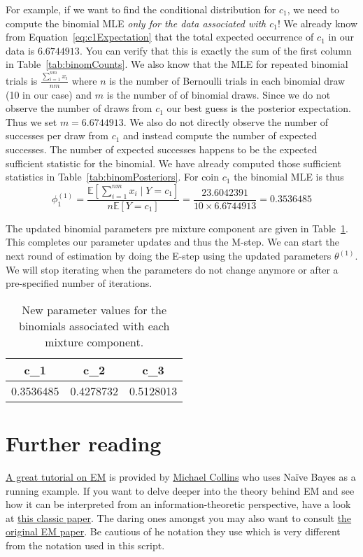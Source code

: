 \documentclass[11pt,leqno,a4paper]{report}\usepackage[]{graphicx}\usepackage[]{color}
\newcommand{\E}{\mathbb{E}}
\begin{document}
For example, if we want to find the conditional distribution for $ c_{1} $, we need to compute the binomial MLE \textit{only
for the data associated with $ c_{1} $}! We already know from Equation~\eqref{eq:c1Expectation} that the total expected 
occurrence of $ c_{1} $ in our data is $ 6.6744913 $. You can verify that this is exactly the sum of the first column in
Table~\ref{tab:binomCounts}. We also know that the MLE for repeated binomial trials is $ \frac{\sum^{nm}_{i=1}x_{i}}{nm} $ where
$ n $ is the number of Bernoulli trials in each binomial draw (10 in our case) and $ m $ is the number of of binomial draws. Since we do
not observe the number of draws from $ c_{1} $ our best guess is the posterior expectation. Thus we set $ m = 6.6744913 $. We also do not
directly observe the number of successes per draw from $ c_{1} $ and instead compute the number of expected successes. The number of 
expected successes happens to be the expected sufficient statistic for the binomial. We have already computed those sufficient statistics
in Table~\ref{tab:binomPosteriors}. For coin $ c_{1} $ the binomial MLE is thus
\begin{equation}
\phi_{1}^{(1)} =  \frac{\E\left[\sum_{i=1}^{nm} x_{i}\mid Y = c_{1}\right]}{n\E\left[Y = c_{1}\right]} 
= \frac{23.6042391}{10 \times 6.6744913}
= 0.3536485
\end{equation}

The updated binomial parameters pre mixture component are given in Table~\ref{tab:newBinoms}. This completes our parameter
updates and thus the M-step. We can start the next round of estimation by doing the E-step using the
updated parameters $ \theta^{(1)} $. We will stop iterating when the parameters do not change anymore or
after a pre-specified number of iterations.

\begin{table}
\center

\begin{tabular}{c|c|c}
\hline
c\_1 & c\_2 & c\_3\\
\hline
0.3536485 & 0.4278732 & 0.5128013\\
\hline
\end{tabular}


\caption{New parameter values for the binomials associated with each mixture component.}
\label{tab:newBinoms}
\end{table}

\section*{Further reading}
\href{http://www.cs.columbia.edu/~mcollins/em.pdf}{A great tutorial on EM} is provided by \href{http://www.cs.columbia.edu/~mcollins/}{Michael Collins} who
uses Na\"ive Bayes as a running example. If you want to delve deeper into the theory behind EM and see how it can be interpreted from an information-theoretic
perspective, have a look at \href{http://www.cs.toronto.edu/~fritz/absps/emk.pdf}{this classic paper}. The daring ones amongst you may also want to consult
\href{http://web.mit.edu/6.435/www/Dempster77.pdf}{the original EM paper}. Be cautious of he notation they use which is very different from the notation
used in this script.
\end{document}
